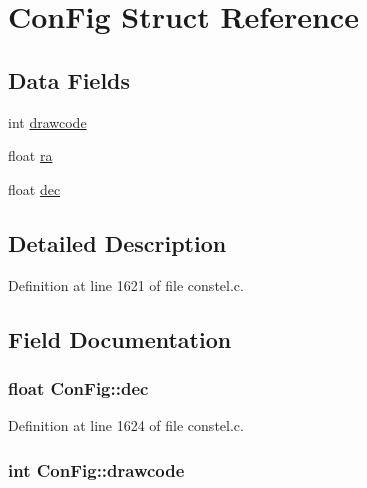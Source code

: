 \hypertarget{struct_con_fig}{\section{Con\-Fig Struct Reference}
\label{struct_con_fig}
}
\subsection*{Data Fields}
\begin{DoxyCompactItemize}
\item 
int \hyperlink{struct_con_fig_acdfcee925b73c274d6a567bfeb77a4bc}{drawcode}
\item 
float \hyperlink{struct_con_fig_a3f87e2c516969cd5f37dcdd271f7eac5}{ra}
\item 
float \hyperlink{struct_con_fig_abc829a867f9ac9922a92a81838e8827a}{dec}
\end{DoxyCompactItemize}


\subsection{Detailed Description}


Definition at line 1621 of file constel.\-c.



\subsection{Field Documentation}
\hypertarget{struct_con_fig_abc829a867f9ac9922a92a81838e8827a}{
\subsubsection[{dec}]{\setlength{\rightskip}{0pt plus 5cm}float Con\-Fig\-::dec}}\label{struct_con_fig_abc829a867f9ac9922a92a81838e8827a}


Definition at line 1624 of file constel.\-c.

\hypertarget{struct_con_fig_acdfcee925b73c274d6a567bfeb77a4bc}{
\subsubsection[{drawcode}]{\setlength{\rightskip}{0pt plus 5cm}int Con\-Fig\-::drawcode}}\label{struct_con_fig_acdfcee925b73c274d6a567bfeb77a4bc}


